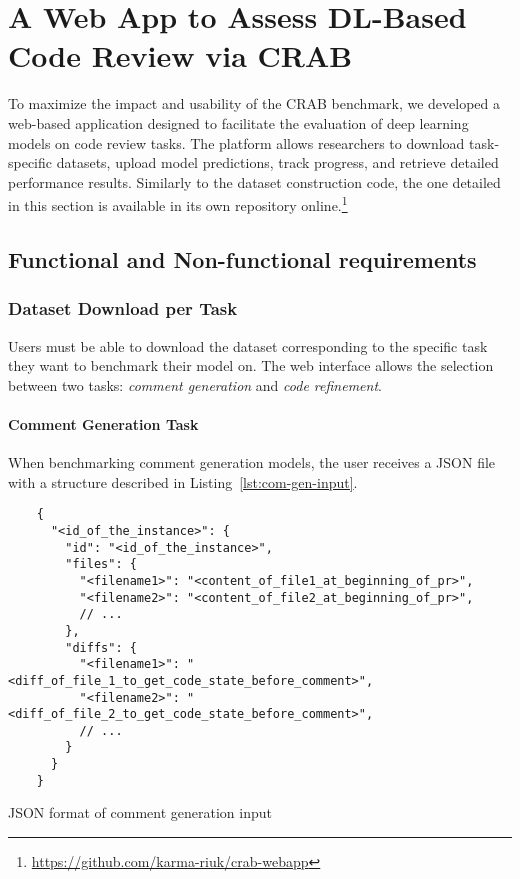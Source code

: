 \section{A Web App to Assess DL-Based Code Review via CRAB}
\label{sec:webapp}

To maximize the impact and usability of the CRAB benchmark, we developed a web-based application
designed to facilitate the evaluation of deep learning models on code review tasks. The platform
allows researchers to download task-specific datasets, upload model predictions, track progress, and
retrieve detailed performance results. Similarly to the dataset construction code, the one detailed
in this section is available in its own repository
online.\footnote{\url{https://github.com/karma-riuk/crab-webapp}}

\subsection{Functional and Non-functional requirements}
\label{sec:req}

\subsubsection{Dataset Download per Task}

Users must be able to download the dataset corresponding to the specific task they want to benchmark
their model on. The web interface allows the selection between two tasks: \emph{comment generation}
and \emph{code refinement}.

\paragraph{Comment Generation Task}

When benchmarking comment generation models, the user receives a JSON file with a structure
described in Listing~\ref{lst:com-gen-input}.

\begin{listing}[!ht]
	\begin{verbatim}
    {
      "<id_of_the_instance>": {
        "id": "<id_of_the_instance>",
        "files": {
          "<filename1>": "<content_of_file1_at_beginning_of_pr>",
          "<filename2>": "<content_of_file2_at_beginning_of_pr>",
          // ...
        },
        "diffs": {
          "<filename1>": "<diff_of_file_1_to_get_code_state_before_comment>",
          "<filename2>": "<diff_of_file_2_to_get_code_state_before_comment>",
          // ...
        }
      }
    }
    \end{verbatim}
	\caption{JSON format of comment generation input}
	\label{lst:com-gen-input}
\end{listing}

